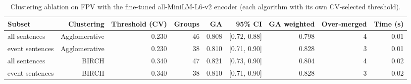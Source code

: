\begin{table}[t]
\centering
\caption{Clustering ablation on FPV with the fine-tuned all-MiniLM-L6-v2 encoder (each algorithm with its own CV-selected threshold).}
\label{tab:clustering_ablation}
\small
\begin{tabular}{lrrrrrrrr}
\toprule
Subset & Clustering & Threshold (CV) & Groups & GA & 95\% CI & GA weighted & Over-merged & Time (s) \\
\midrule
all sentences & Agglomerative & 0.230 & 46 & 0.808 & [0.72, 0.88] & 0.798 & 4 & 0.01 \\
event sentences & Agglomerative & 0.230 & 38 & 0.810 & [0.71, 0.90] & 0.828 & 3 & 0.01 \\
all sentences & BIRCH & 0.340 & 47 & 0.821 & [0.73, 0.90] & 0.804 & 4 & 0.02 \\
event sentences & BIRCH & 0.340 & 38 & 0.810 & [0.71, 0.90] & 0.828 & 3 & 0.02 \\
\bottomrule
\end{tabular}
\end{table}